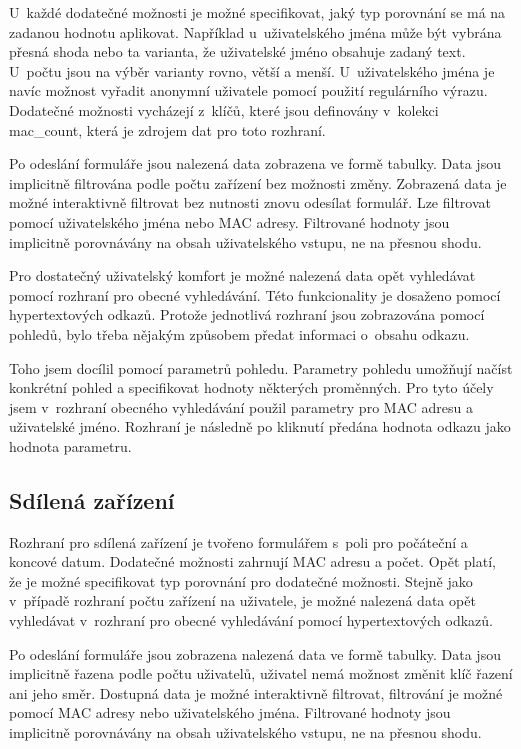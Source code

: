 \documentclass[thesis=M,czech]{FITthesis}[2012/06/26]
\begin{document}
      U~každé dodatečné možnosti je možné specifikovat,
      jaký typ porovnání se má na zadanou hodnotu aplikovat.
      Například u~uživatelského jména může být vybrána přesná shoda nebo
      ta varianta, že uživatelské jméno obsahuje zadaný text.
      U~počtu jsou na výběr varianty rovno, větší a menší.
      U~uživatelského jména je navíc možnost vyřadit anonymní uživatele pomocí použití regulárního výrazu.
      Dodatečné možnosti vycházejí z~klíčů, které jsou definovány
      v~kolekci mac\_count, která je zdrojem dat pro toto rozhraní.
    
      Po odeslání formuláře jsou nalezená data zobrazena ve formě tabulky.
      Data jsou implicitně filtrována podle počtu zařízení bez možnosti změny.
      Zobrazená data je možné interaktivně filtrovat bez nutnosti znovu odesílat formulář.
      Lze filtrovat pomocí uživatelského jména nebo MAC adresy.
      Filtrované hodnoty jsou implicitně porovnávány na obsah uživatelského vstupu, ne na přesnou shodu.

      Pro dostatečný uživatelský komfort je možné nalezená data
      opět vyhledávat pomocí rozhraní pro obecné vyhledávání.
      Této funkcionality je dosaženo pomocí hypertextových odkazů.
      Protože jednotlivá rozhraní jsou zobrazována pomocí pohledů,
      bylo třeba nějakým způsobem předat informaci o~obsahu odkazu.

      Toho jsem docílil pomocí parametrů pohledu.
      Parametry pohledu umožňují načíst konkrétní pohled a specifikovat
      hodnoty některých proměnných.
      Pro tyto účely jsem v~rozhraní obecného vyhledávání použil parametry
      pro MAC adresu a uživatelské jméno. 
      Rozhraní je následně po kliknutí předána hodnota odkazu jako hodnota parametru.

    \subsection{Sdílená zařízení}
    
      Rozhraní pro sdílená zařízení je tvořeno
      formulářem s~poli pro počáteční a koncové datum.
      Dodatečné možnosti zahrnují MAC adresu a počet.
      Opět platí, že je možné specifikovat typ porovnání pro dodatečné možnosti.
      Stejně jako v~případě rozhraní počtu zařízení na uživatele,
      je možné nalezená data opět vyhledávat v~rozhraní pro obecné vyhledávání
      pomocí hypertextových odkazů.

      Po odeslání formuláře jsou zobrazena nalezená data ve formě tabulky.
      Data jsou implicitně řazena podle počtu uživatelů, 
      uživatel nemá možnost změnit klíč řazení ani jeho směr.
      Dostupná data je možné interaktivně filtrovat,
      filtrování je možné pomocí MAC adresy nebo uživatelského jména.
      Filtrované hodnoty jsou implicitně porovnávány na obsah uživatelského vstupu, ne na přesnou shodu.
\end{document}
